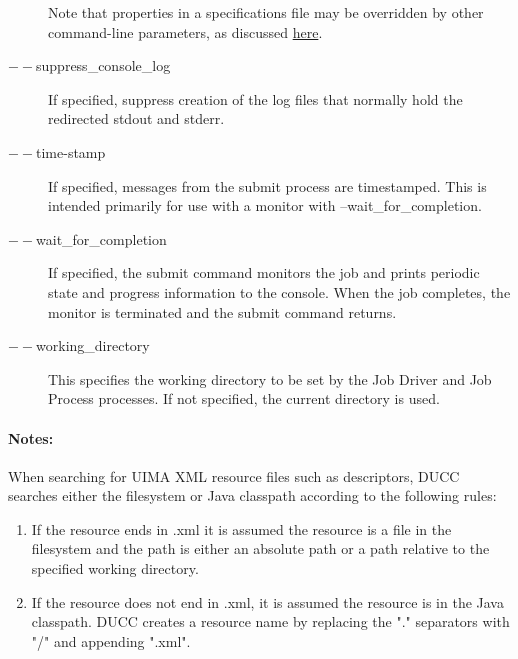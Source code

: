 \begin{description}
             Note that properties in a specifications file may be overridden by other command-line
             parameters, as discussed \hyperref[chap:cli]{here}.

           \item[$--$suppress\_console\_log] If specified, suppress creation of the log files that 
             normally hold the redirected stdout and stderr.

           \item[$--$time-stamp ]

             If specified, messages from the submit process are timestamped. This is intended primarily 
             for use with a monitor with --wait\_for\_completion. 

           \item[$--$wait\_for\_completion ]             
             If specified, the submit command monitors the job and prints periodic
             state and progress information to the console.  When the job completes, the monitor
             is terminated and the submit command returns.
             
           \item[$--$working\_directory ]             
             This specifies the working directory to be set by the Job Driver and Job Process processes. 
             If not specified, the current directory is used.
  \end{description}
             
  \paragraph{Notes:}
  \label{par:cli.submit.notes}
  When searching for UIMA XML resource files such as descriptors, DUCC searches either the 
  filesystem or Java classpath according to the following rules:
  \begin{enumerate}
    \item If the resource ends in .xml it is assumed the resource is a file in the filesystem 
      and the path is either an absolute path or a path relative to the specified working directory.
    \item If the resource does not end in .xml, it is assumed the resource is in the Java
      classpath. DUCC creates a resource name by replacing the "." separators with "/" and appending ".xml".
  \end{enumerate}
